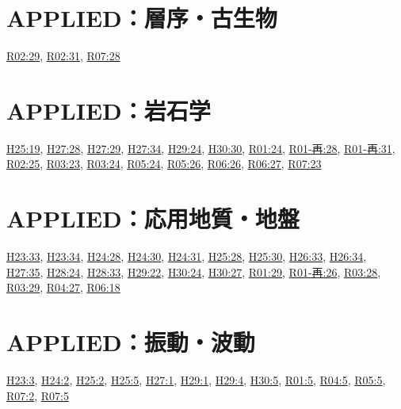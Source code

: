 \section{APPLIED：層序・古生物}
\hyperref[q:r02-reg-applied-29]{R02:29}, \hyperref[q:r02-reg-applied-31]{R02:31}, \hyperref[q:r07-reg-applied-28]{R07:28}
\section{APPLIED：岩石学}
\hyperref[q:h25-reg-applied-19]{H25:19}, \hyperref[q:h27-reg-applied-28]{H27:28}, \hyperref[q:h27-reg-applied-29]{H27:29}, \hyperref[q:h27-reg-applied-34]{H27:34}, \hyperref[q:h29-reg-applied-24]{H29:24}, \hyperref[q:h30-reg-applied-30]{H30:30}, \hyperref[q:r01-reg-applied-24]{R01:24}, \hyperref[q:r01-ret-applied-28]{R01-再:28}, \hyperref[q:r01-ret-applied-31]{R01-再:31}, \hyperref[q:r02-reg-applied-25]{R02:25}, \hyperref[q:r03-reg-applied-23]{R03:23}, \hyperref[q:r03-reg-applied-24]{R03:24}, \hyperref[q:r05-reg-applied-24]{R05:24}, \hyperref[q:r05-reg-applied-26]{R05:26}, \hyperref[q:r06-reg-applied-26]{R06:26}, \hyperref[q:r06-reg-applied-27]{R06:27}, \hyperref[q:r07-reg-applied-23]{R07:23}
\section{APPLIED：応用地質・地盤}
\hyperref[q:h23-reg-applied-33]{H23:33}, \hyperref[q:h23-reg-applied-34]{H23:34}, \hyperref[q:h24-reg-applied-28]{H24:28}, \hyperref[q:h24-reg-applied-30]{H24:30}, \hyperref[q:h24-reg-applied-31]{H24:31}, \hyperref[q:h25-reg-applied-28]{H25:28}, \hyperref[q:h25-reg-applied-30]{H25:30}, \hyperref[q:h26-reg-applied-33]{H26:33}, \hyperref[q:h26-reg-applied-34]{H26:34}, \hyperref[q:h27-reg-applied-35]{H27:35}, \hyperref[q:h28-reg-applied-24]{H28:24}, \hyperref[q:h28-reg-applied-33]{H28:33}, \hyperref[q:h29-reg-applied-22]{H29:22}, \hyperref[q:h30-reg-applied-24]{H30:24}, \hyperref[q:h30-reg-applied-27]{H30:27}, \hyperref[q:r01-reg-applied-29]{R01:29}, \hyperref[q:r01-ret-applied-26]{R01-再:26}, \hyperref[q:r03-reg-applied-28]{R03:28}, \hyperref[q:r03-reg-applied-29]{R03:29}, \hyperref[q:r04-reg-applied-27]{R04:27}, \hyperref[q:r06-reg-applied-18]{R06:18}
\section{APPLIED：振動・波動}
\hyperref[q:h23-reg-applied-03]{H23:3}, \hyperref[q:h24-reg-applied-02]{H24:2}, \hyperref[q:h25-reg-applied-02]{H25:2}, \hyperref[q:h25-reg-applied-05]{H25:5}, \hyperref[q:h27-reg-applied-01]{H27:1}, \hyperref[q:h29-reg-applied-01]{H29:1}, \hyperref[q:h29-reg-applied-04]{H29:4}, \hyperref[q:h30-reg-applied-05]{H30:5}, \hyperref[q:r01-reg-applied-05]{R01:5}, \hyperref[q:r04-reg-applied-05]{R04:5}, \hyperref[q:r05-reg-applied-05]{R05:5}, \hyperref[q:r07-reg-applied-02]{R07:2}, \hyperref[q:r07-reg-applied-05]{R07:5}
